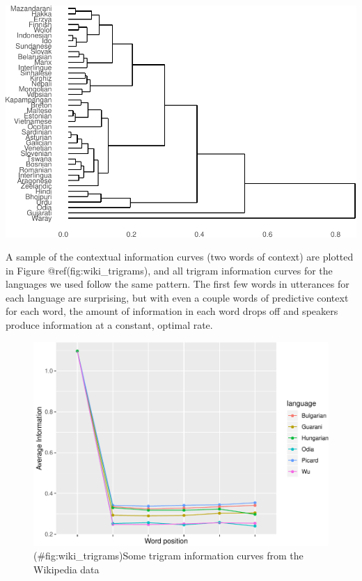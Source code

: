 \documentclass[11pt,]{article}
\begin{document}
\includegraphics{paper_files/figure-latex/dendro-1.pdf}

A sample of the contextual information curves (two words of context) are plotted in Figure @ref(fig:wiki\_trigrams), and all trigram information curves for the languages we used follow the same pattern. The first few words in utterances for each language are surprising, but with even a couple words of predictive context for each word, the amount of information in each word drops off and speakers produce information at a constant, optimal rate.

\begin{figure}
\centering
\includegraphics{paper_files/figure-latex/wiki_trigrams-1.pdf}
\caption{(\#fig:wiki\_trigrams)Some trigram information curves from the Wikipedia data}
\end{figure}
\end{document}
